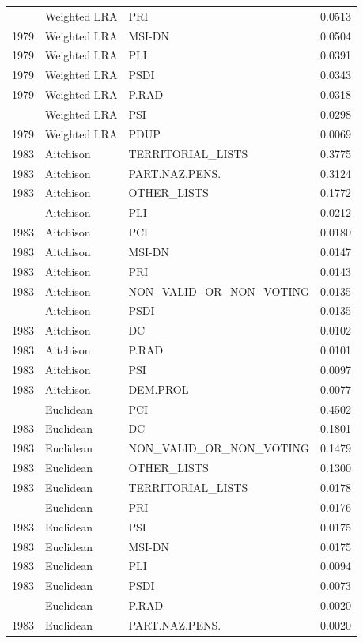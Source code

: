 \begin{longtable}[t]{rllr}
\addlinespace
1979 & Weighted LRA & PRI & 0.0513\\
1979 & Weighted LRA & MSI-DN & 0.0504\\
1979 & Weighted LRA & PLI & 0.0391\\
1979 & Weighted LRA & PSDI & 0.0343\\
1979 & Weighted LRA & P.RAD & 0.0318\\
\addlinespace
1979 & Weighted LRA & PSI & 0.0298\\
1979 & Weighted LRA & PDUP & 0.0069\\
1983 & Aitchison & TERRITORIAL\_LISTS & 0.3775\\
1983 & Aitchison & PART.NAZ.PENS. & 0.3124\\
1983 & Aitchison & OTHER\_LISTS & 0.1772\\
\addlinespace
1983 & Aitchison & PLI & 0.0212\\
1983 & Aitchison & PCI & 0.0180\\
1983 & Aitchison & MSI-DN & 0.0147\\
1983 & Aitchison & PRI & 0.0143\\
1983 & Aitchison & NON\_VALID\_OR\_NON\_VOTING & 0.0135\\
\addlinespace
1983 & Aitchison & PSDI & 0.0135\\
1983 & Aitchison & DC & 0.0102\\
1983 & Aitchison & P.RAD & 0.0101\\
1983 & Aitchison & PSI & 0.0097\\
1983 & Aitchison & DEM.PROL & 0.0077\\
\addlinespace
1983 & Euclidean & PCI & 0.4502\\
1983 & Euclidean & DC & 0.1801\\
1983 & Euclidean & NON\_VALID\_OR\_NON\_VOTING & 0.1479\\
1983 & Euclidean & OTHER\_LISTS & 0.1300\\
1983 & Euclidean & TERRITORIAL\_LISTS & 0.0178\\
\addlinespace
1983 & Euclidean & PRI & 0.0176\\
1983 & Euclidean & PSI & 0.0175\\
1983 & Euclidean & MSI-DN & 0.0175\\
1983 & Euclidean & PLI & 0.0094\\
1983 & Euclidean & PSDI & 0.0073\\
\addlinespace
1983 & Euclidean & P.RAD & 0.0020\\
1983 & Euclidean & PART.NAZ.PENS. & 0.0020\\

\end{longtable}
